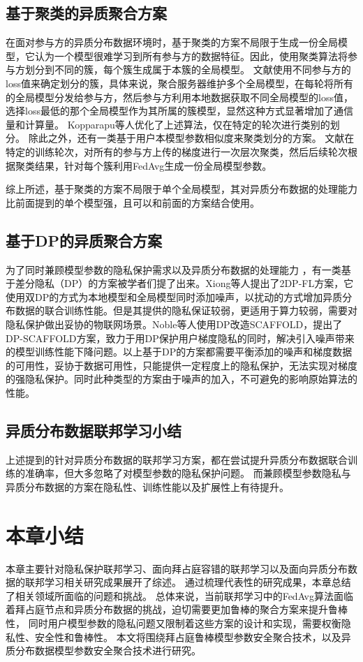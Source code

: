 \subsection{基于聚类的异质聚合方案}
在面对参与方的异质分布数据环境时，基于聚类的方案不局限于生成一份全局模型，它认为一个模型很难学习到所有参与方的数据特征。因此，使用聚类算法将参与方划分到不同的簇，每个簇生成属于本簇的全局模型。
文献\cite{ghosh2022efficient}使用不同参与方的loss值来确定划分的簇，具体来说，聚合服务器维护多个全局模型，在每轮将所有的全局模型分发给参与方，然后参与方利用本地数据获取不同全局模型的loss值，选择loss最低的那个全局模型作为其所属的簇模型，显然这种方式显著增加了通信量和计算量。
Kopparapu等人\cite{kopparapu2020fedfmc}优化了上述算法，仅在特定的轮次进行类别的划分。
除此之外，还有一类基于用户本模型参数相似度来聚类划分的方案\cite{briggs2020federated, sattler2020clustered, dempster1977maximum}。
文献\cite{briggs2020federated}在特定的训练轮次，对所有的参与方上传的梯度进行一次层次聚类，然后后续轮次根据聚类结果，针对每个簇利用FedAvg生成一份全局模型参数。

综上所述，基于聚类的方案不局限于单个全局模型，其对异质分布数据的处理能力比前面提到的单个模型强，且可以和前面的方案结合使用。

\subsection{基于DP的异质聚合方案}
为了同时兼顾模型参数的隐私保护需求以及异质分布数据的处理能力
，有一类基于差分隐私（DP）的方案被学者们提了出来\cite{xiong2021privacy, noble2022differentially}。Xiong等人\cite{xiong2021privacy}提出了2DP-FL方案，它使用双DP的方式为本地模型和全局模型同时添加噪声，以扰动的方式增加异质分布数据的联合训练性能。但是其提供的隐私保证较弱，更适用于算力较弱，需要对隐私保护做出妥协的物联网场景。Noble等人\cite{noble2022differentially}使用DP改造SCAFFOLD，提出了DP-SCAFFOLD方案，致力于用DP保护用户梯度隐私的同时，解决引入噪声带来的模型训练性能下降问题。以上基于DP的方案都需要平衡添加的噪声和梯度数据的可用性，妥协于数据可用性，只能提供一定程度上的隐私保护，无法实现对梯度的强隐私保护。同时此种类型的方案由于噪声的加入，不可避免的影响原始算法的性能。

\subsection{异质分布数据联邦学习小结}
上述提到的针对异质分布数据的联邦学习方案，都在尝试提升异质分布数据联合训练的准确率，但大多忽略了对模型参数的隐私保护问题。
而兼顾模型参数隐私与异质分布数据的方案在隐私性、训练性能以及扩展性上有待提升。
\section{本章小结}
本章主要针对隐私保护联邦学习、面向拜占庭容错的联邦学习以及面向异质分布数据的联邦学习相关研究成果展开了综述。
通过梳理代表性的研究成果，本章总结了相关领域所面临的问题和挑战。
总体来说，当前联邦学习中的FedAvg算法面临着拜占庭节点和异质分布数据的挑战，迫切需要更加鲁棒的聚合方案来提升鲁棒性，
同时用户模型参数的隐私问题又限制着这些方案的设计和实现，需要权衡隐私性、安全性和鲁棒性。
本文将围绕拜占庭鲁棒模型参数安全聚合技术，以及异质分布数据模型参数安全聚合技术进行研究。
